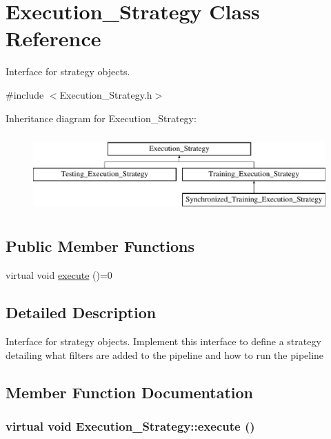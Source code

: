 \hypertarget{class_execution___strategy}{
\section{Execution\_\-Strategy Class Reference}
\label{class_execution___strategy}
}


Interface for strategy objects.  




{\ttfamily \#include $<$Execution\_\-Strategy.h$>$}

Inheritance diagram for Execution\_\-Strategy:\begin{figure}[H]
\begin{center}
\leavevmode
\includegraphics[height=3cm]{class_execution___strategy}
\end{center}
\end{figure}
\subsection*{Public Member Functions}
\begin{DoxyCompactItemize}
\item 
virtual void \hyperlink{class_execution___strategy_a62fc15af296f2f27f44848eb56aa3ff9}{execute} ()=0
\end{DoxyCompactItemize}


\subsection{Detailed Description}
Interface for strategy objects. Implement this interface to define a strategy detailing what filters are added to the pipeline and how to run the pipeline 

\subsection{Member Function Documentation}
\hypertarget{class_execution___strategy_a62fc15af296f2f27f44848eb56aa3ff9}{
\subsubsection[{execute}]{\setlength{\rightskip}{0pt plus 5cm}virtual void Execution\_\-Strategy::execute ()}}
\label{class_execution___strategy_a62fc15af296f2f27f44848eb56aa3ff9}


